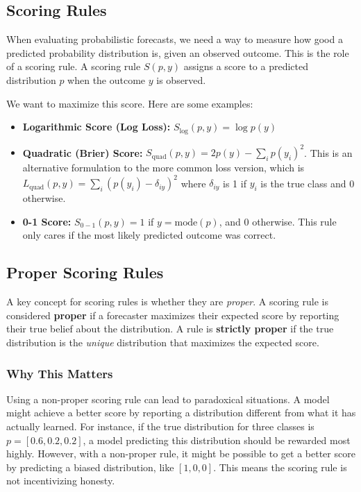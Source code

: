 \documentclass{article}
\begin{document}
\begin{multicols}{2}
\section{Scoring Rules}
When evaluating probabilistic forecasts, we need a way to measure how good a predicted probability distribution is, given an observed outcome. This is the role of a scoring rule. A scoring rule $S(p, y)$ assigns a score to a predicted distribution $p$ when the outcome $y$ is observed.

We want to maximize this score. Here are some examples:
\begin{itemize}
    \item \textbf{Logarithmic Score (Log Loss):} $S_{\text{log}}(p, y) = \log p(y)$
    \item \textbf{Quadratic (Brier) Score:} $S_{\text{quad}}(p, y) = 2p(y) - \sum_{i} p(y_i)^2$. This is an alternative formulation to the more common loss version, which is $L_{\text{quad}}(p, y) = \sum_{i} (p(y_i) - \delta_{iy})^2$ where $\delta_{iy}$ is 1 if $y_i$ is the true class and 0 otherwise.
    \item \textbf{0-1 Score:} $S_{0-1}(p, y) = 1$ if $y = \text{mode}(p)$, and 0 otherwise. This rule only cares if the most likely predicted outcome was correct.
\end{itemize}

\subsection{Proper Scoring Rules}
A key concept for scoring rules is whether they are \textit{proper}. A scoring rule is considered \textbf{proper} if a forecaster maximizes their expected score by reporting their true belief about the distribution. A rule is \textbf{strictly proper} if the true distribution is the \textit{unique} distribution that maximizes the expected score.

\subsubsection{Why This Matters}
Using a non-proper scoring rule can lead to paradoxical situations. A model might achieve a better score by reporting a distribution different from what it has actually learned. For instance, if the true distribution for three classes is $p = [0.6, 0.2, 0.2]$, a model predicting this distribution should be rewarded most highly. However, with a non-proper rule, it might be possible to get a better score by predicting a biased distribution, like $[1, 0, 0]$. This means the scoring rule is not incentivizing honesty.


\end{multicols}
\end{document}
